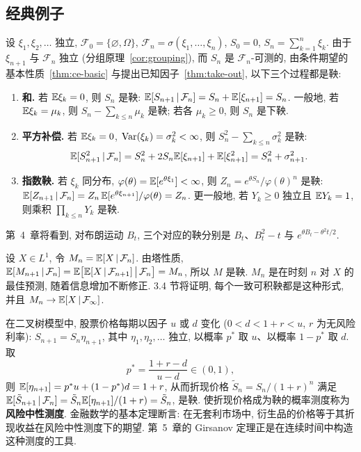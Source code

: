 \subsection{经典例子}

\begin{example}[独立随机变量的和与积]\label{ex:sum-martingales}
设 $\xi_1,\xi_2,\dots$ 独立, $\mathcal{F}_0=\{\varnothing,\Omega\}$, $\mathcal{F}_n=\sigma(\xi_1,\dots,\xi_n)$, $S_0=0$, $S_n=\sum_{k=1}^n\xi_k$. 由于 $\xi_{n+1}$ 与 $\mathcal{F}_n$ 独立 (分组原理~\ref{cor:grouping}), 而 $S_n$ 是 $\mathcal{F}_n$-可测的, 由条件期望的基本性质~\ref{thm:ce-basic} 与提出已知因子~\ref{thm:take-out}, 以下三个过程都是鞅:
\begin{enumerate}
\item \textbf{和.} 若 $\mathbb{E}\xi_k=0$, 则 $S_n$ 是鞅: $\mathbb{E}[S_{n+1}\,|\,\mathcal{F}_n]=S_n+\mathbb{E}[\xi_{n+1}]=S_n$. 一般地, 若 $\mathbb{E}\xi_k=\mu_k$, 则 $S_n-\sum_{k\le n}\mu_k$ 是鞅; 若各 $\mu_k\ge0$, 则 $S_n$ 是下鞅.
\item \textbf{平方补偿.} 若 $\mathbb{E}\xi_k=0$, $\operatorname{Var}(\xi_k)=\sigma_k^2<\infty$, 则 $S_n^2-\sum_{k\le n}\sigma_k^2$ 是鞅:
\[
\mathbb{E}[S_{n+1}^2\,|\,\mathcal{F}_n]=S_n^2+2S_n\mathbb{E}[\xi_{n+1}]+\mathbb{E}[\xi_{n+1}^2]=S_n^2+\sigma_{n+1}^2.
\]
\item \textbf{指数鞅.} 若 $\xi_k$ 同分布, $\varphi(\theta)=\mathbb{E}[e^{\theta\xi_1}]<\infty$, 则 $Z_n=e^{\theta S_n}/\varphi(\theta)^n$ 是鞅:
$\mathbb{E}[Z_{n+1}\,|\,\mathcal{F}_n]=Z_n\,\mathbb{E}[e^{\theta\xi_{n+1}}]/\varphi(\theta)=Z_n$. 更一般地, 若 $Y_k\ge0$ 独立且 $\mathbb{E} Y_k=1$, 则乘积 $\prod_{k\le n}Y_k$ 是鞅.
\end{enumerate}
第~4~章将看到, 对布朗运动 $B_t$, 三个对应的鞅分别是 $B_t$、$B_t^2-t$ 与 $e^{\theta B_t-\theta^2t/2}$.
\end{example}

\begin{example}[Doob 鞅]\label{ex:doob-martingale}
设 $X\in L^1$, 令 $M_n=\mathbb{E}[X\,|\,\mathcal{F}_n]$. 由塔性质, $\mathbb{E}[M_{n+1}\,|\,\mathcal{F}_n]=\mathbb{E}\big[\mathbb{E}[X\,|\,\mathcal{F}_{n+1}]\,\big|\,\mathcal{F}_n\big]=M_n$, 所以 $M$ 是鞅. $M_n$ 是在时刻 $n$ 对 $X$ 的最佳预测, 随着信息增加不断修正. 3.4 节将证明, 每个一致可积鞅都是这种形式, 并且 $M_n\to\mathbb{E}[X\,|\,\mathcal{F}_\infty]$.
\end{example}

\begin{example}[折现资产价格]\label{ex:binomial-model}
在二叉树模型中, 股票价格每期以因子 $u$ 或 $d$ 变化 ($0<d<1+r<u$, $r$ 为无风险利率): $S_{n+1}=S_n\eta_{n+1}$, 其中 $\eta_1,\eta_2,\dots$ 独立, 以概率 $p^*$ 取 $u$、以概率 $1-p^*$ 取 $d$. 取
\[
p^*=\frac{1+r-d}{u-d}\in(0,1),
\]
则 $\mathbb{E}[\eta_{n+1}]=p^*u+(1-p^*)d=1+r$, 从而折现价格 $\tilde S_n=S_n/(1+r)^n$ 满足 $\mathbb{E}[\tilde S_{n+1}\,|\,\mathcal{F}_n]=\tilde S_n\mathbb{E}[\eta_{n+1}]/(1+r)=\tilde S_n$, 是鞅. 使折现价格成为鞅的概率测度称为\textbf{风险中性测度}. 金融数学的基本定理断言: 在无套利市场中, 衍生品的价格等于其折现收益在风险中性测度下的期望. 第~5~章的 Girsanov 定理正是在连续时间中构造这种测度的工具.
\end{example}


